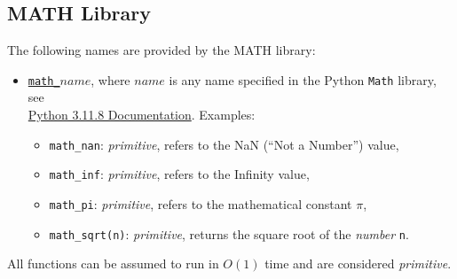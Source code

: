 \subsection*{MATH Library}


The following names are provided by the MATH library:
\begin{itemize}
\item \href{https://sourceacademy.org/sicpjs/1.1.4\#p8}{\lstinline{math_}$\textit{name}$},
where $\textit{name}$ is any name specified in the
Python
\texttt{Math} library, see\\
\href{https://docs.python.org/3.11/library/math.html}{\color{DarkBlue}Python 3.11.8 Documentation}. Examples:
\begin{itemize}
\item \verb#math_nan#: \textit{primitive}, refers to the NaN (``Not a Number'') value,
\item \verb#math_inf#: \textit{primitive}, refers to the Infinity value,
\item \verb#math_pi#: \textit{primitive}, refers to the mathematical constant $\pi$,
\item \verb#math_sqrt#\texttt{(n)}: \textit{primitive}, returns the square root of the \emph{number} \texttt{n}.
\end{itemize}
\end{itemize}
All functions can be assumed to run in $O(1)$ time and are considered
\textit{primitive}.
